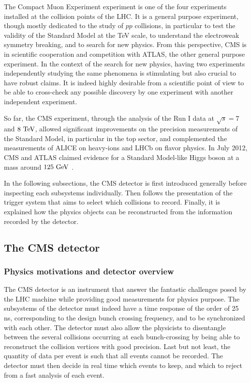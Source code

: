     The Compact Muon Experiment experiment is one of the four experiments
    installed at the collision points of the LHC. It is a general purpose
    experiment, though mostly dedicated to the study of $pp$ collisions, in
    particular to test the validity of the Standard Model at the TeV scale, to
    understand the electroweak symmetry breaking, and to search for new physics.
    From this perspective, CMS is in scientific cooperation and competition with
    ATLAS, the other general purpose experiment. In the context of the search
    for new physics, having two experiments independently studying the same
    phenomena is stimulating but also crucial to have robust claims. It is
    indeed highly desirable from a scientific point of view to be able to
    cross-check any possible discovery by one experiment with another
    independent experiment.

    So far, the CMS experiment, through the analysis of the Run I data at
    $\sqrt{s} = 7$ and $8~\text{TeV}$, allowed significant improvements on the
    precision measurements of the Standard Model, in particular in the top
    sector, and complemented the measurements of ALICE on heavy-ions and LHCb on
    flavor physics. In July 2012, CMS and ATLAS claimed evidence for a Standard
    Model-like Higgs boson at a mass around $125~\text{GeV}$ \cite{CMSHiggs,
    ATLASHiggs}.

    In the following subsections, the CMS detector is first introduced generally
    before inspecting each subsystems individually. Then follows the
    presentation of the trigger system that aims to select which collisions to
    record. Finally, it is explained how the physics objects can be
    reconstructed from the information recorded by the detector.

    \subsection{The CMS detector}

        \subsubsection{Physics motivations and detector overview}

    The CMS detector \cite{CMSdetector} is an instrument that answer the
    fantastic challenges posed by the LHC machine while providing good
    measurements for physics purpose.  The subsystems of the detector must
    indeed have a time response of the order of 25 ns, corresponding to the
    design bunch crossing frequency, and to be synchronized with each other. The
    detector must also allow the physicists to disentangle between the several
    collisions occurring at each bunch-crossing by being able to reconstruct the
    collision vertices with good precision. Last but not least, the quantity of
    data per event is such that all events cannot be recorded. The detector must
    then decide in real time which events to keep, and which to reject from a
    fast analysis of each event.

